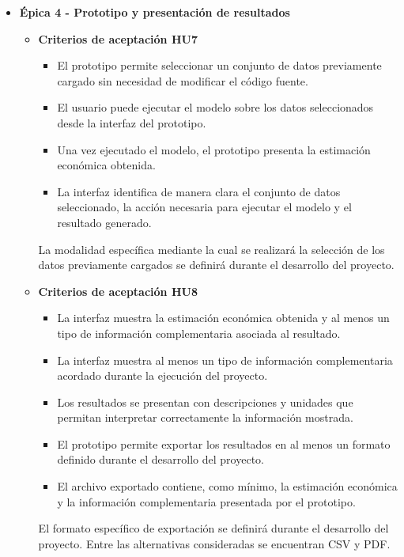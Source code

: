 \documentclass[
11pt, %
]{charter}
\begin{document}
\begin{itemize}
\begin{itemize}
    \end{itemize}


  \item \textbf{\'{E}pica 4 - Prototipo y presentación de resultados}
    \begin{itemize}

      \item \textbf{Criterios de aceptación HU7}
        \begin{itemize}
          \item El prototipo permite seleccionar un conjunto de datos previamente cargado sin necesidad de modificar el código fuente.
          \item El usuario puede ejecutar el modelo sobre los datos seleccionados desde la interfaz del prototipo.
          \item Una vez ejecutado el modelo, el prototipo presenta la estimación económica obtenida.
          \item La interfaz identifica de manera clara el conjunto de datos seleccionado, la acción necesaria para ejecutar el modelo y el resultado generado.
        \end{itemize}

      La modalidad específica mediante la cual se realizará la selección de los datos previamente cargados se definirá durante el desarrollo del proyecto.

      \item \textbf{Criterios de aceptación HU8}
        \begin{itemize}
          \item La interfaz muestra la estimación económica obtenida y al menos un tipo de información complementaria asociada al resultado.
          \item La interfaz muestra al menos un tipo de información complementaria acordado durante la ejecución del proyecto.
          \item Los resultados se presentan con descripciones y unidades que permitan interpretar correctamente la información mostrada.
          \item El prototipo permite exportar los resultados en al menos un formato definido durante el desarrollo del proyecto.
          \item El archivo exportado contiene, como mínimo, la estimación económica y la información complementaria presentada por el prototipo.
        \end{itemize}

      El formato específico de exportación se definirá durante el desarrollo del proyecto. Entre las alternativas consideradas se encuentran CSV y PDF.

    \end{itemize}

\end{itemize}
\end{document}
